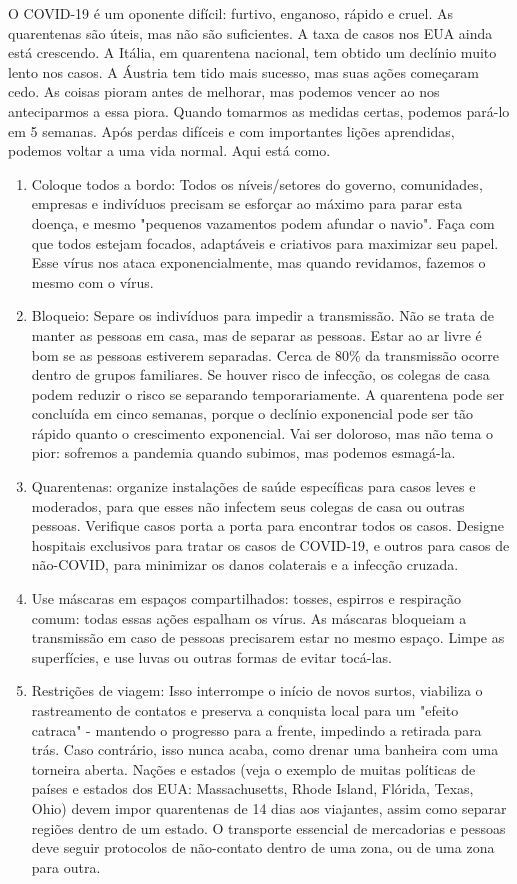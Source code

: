 \documentclass[onecolumn,journal]{IEEEtran}
\begin{document}
\begin{multicols}{2}


O COVID-19 é um oponente difícil: furtivo, enganoso, rápido e cruel. As quarentenas são úteis, mas não são suficientes. A taxa de casos nos EUA ainda está crescendo. A Itália, em quarentena nacional, tem obtido um declínio muito lento nos casos. A Áustria tem tido mais sucesso, mas suas ações começaram cedo. As coisas pioram antes de melhorar, mas podemos vencer ao nos anteciparmos a essa piora. Quando tomarmos as medidas certas, podemos pará-lo em 5 semanas. Após perdas difíceis e com importantes lições aprendidas, podemos voltar a uma vida normal. Aqui está como.

\begin{enumerate}
    \item Coloque todos a bordo: Todos os níveis/setores do governo, comunidades, empresas e indivíduos precisam se esforçar ao máximo para parar esta doença, e mesmo "pequenos vazamentos podem afundar o navio". Faça com que todos estejam focados, adaptáveis e criativos para maximizar seu papel. Esse vírus nos ataca exponencialmente, mas quando revidamos, fazemos o mesmo com o vírus.
    \item Bloqueio: Separe os indivíduos para impedir a transmissão. Não se trata de manter as pessoas em casa, mas de separar as pessoas. Estar ao ar livre é bom se as pessoas estiverem separadas. Cerca de 80\% da transmissão ocorre dentro de grupos familiares. Se houver risco de infecção, os colegas de casa podem reduzir o risco se separando temporariamente. A quarentena pode ser concluída em cinco semanas, porque o declínio exponencial pode ser tão rápido quanto o crescimento exponencial. Vai ser doloroso, mas não tema o pior: sofremos a pandemia quando subimos, mas podemos esmagá-la.
    \item Quarentenas: organize instalações de saúde específicas para casos leves e moderados, para que esses não infectem seus colegas de casa ou outras pessoas. Verifique casos porta a porta para encontrar todos os casos. Designe hospitais exclusivos para tratar os casos de COVID-19, e outros para casos de não-COVID, para minimizar os danos colaterais e a infecção cruzada.
    \item Use máscaras em espaços compartilhados: tosses, espirros e respiração comum: todas essas ações espalham os vírus. As máscaras bloqueiam a transmissão em caso de pessoas precisarem estar no mesmo espaço. Limpe as superfícies, e use luvas ou outras formas de evitar tocá-las.
    \item Restrições de viagem: Isso interrompe o início de novos surtos, viabiliza o rastreamento de contatos e preserva a conquista local para um "efeito catraca" - mantendo o progresso para a frente, impedindo a retirada para trás. Caso contrário, isso nunca acaba, como drenar uma banheira com uma torneira aberta. Nações e estados (veja o exemplo de muitas políticas de países e estados dos EUA: Massachusetts, Rhode Island, Flórida, Texas, Ohio) devem impor quarentenas de 14 dias aos viajantes, assim como separar regiões dentro de um estado. O transporte essencial de mercadorias e pessoas deve seguir protocolos de não-contato dentro de uma zona, ou de uma zona para outra.

\end{enumerate}
\end{multicols}
\end{document}
